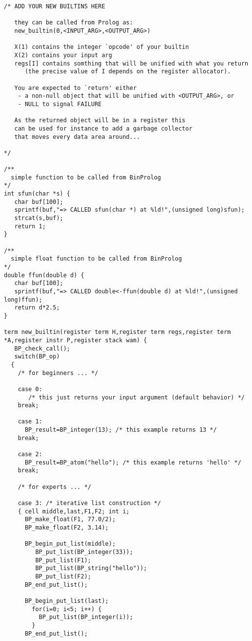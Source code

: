\documentclass{article}
\begin{document}
{\small
\begin{verbatim}
/* ADD YOUR NEW BUILTINS HERE

   they can be called from Prolog as:
   new_builtin(0,<INPUT_ARG>,<OUTPUT_ARG>)
   
   X(1) contains the integer `opcode' of your builtin
   X(2) contains your input arg
   regs[I] contains somthing that will be unified with what you return
      (the precise value of I depends on the register allocator).

   You are expected to `return' either 
    - a non-null object that will be unified with <OUTPUT_ARG>, or
    - NULL to signal FAILURE

   As the returned object will be in a register this
   can be used for instance to add a garbage collector
   that moves every data area around...

*/

/**
  simple function to be called from BinProlog
*/
int sfun(char *s) {
   char buf[100];
   sprintf(buf,"=> CALLED sfun(char *) at %ld!",(unsigned long)sfun);
   strcat(s,buf);
   return 1;
}

/**
  simple float function to be called from BinProlog
*/
double ffun(double d) {
   char buf[100];
   sprintf(buf,"=> CALLED double<-ffun(double d) at %ld!",(unsigned long)ffun);
   return d*2.5;
}

term new_builtin(register term H,register term regs,register term *A,register instr P,register stack wam) {
   BP_check_call(); 
   switch(BP_op)
  { 
    /* for beginners ... */

    case 0: 
       /* this just returns your input argument (default behavior) */
    break;

    case 1: 
      BP_result=BP_integer(13); /* this example returns 13 */
    break;

    case 2: 
      BP_result=BP_atom("hello"); /* this example returns 'hello' */
    break;

    /* for experts ... */

    case 3: /* iterative list construction */
    { cell middle,last,F1,F2; int i;
      BP_make_float(F1, 77.0/2);
      BP_make_float(F2, 3.14);

      BP_begin_put_list(middle);
         BP_put_list(BP_integer(33));
         BP_put_list(F1);
         BP_put_list(BP_string("hello"));
         BP_put_list(F2);
      BP_end_put_list();
 
      BP_begin_put_list(last);
        for(i=0; i<5; i++) {
          BP_put_list(BP_integer(i));
        }
      BP_end_put_list();
      

\end{verbatim}}
\end{document}
